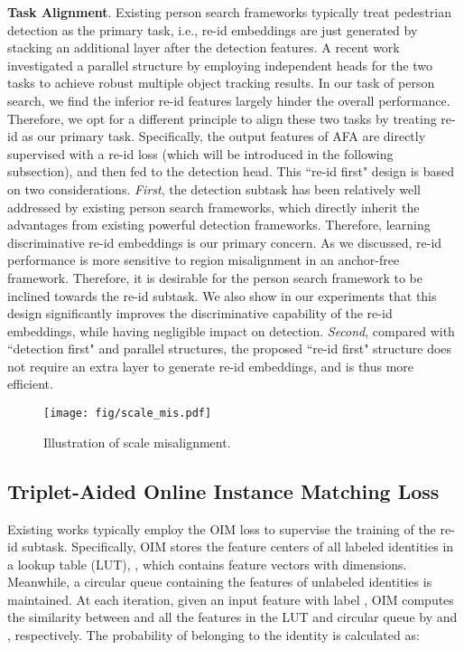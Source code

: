 \documentclass[journal]{IEEEtran}
\begin{document}
\textbf{Task Alignment}. Existing person search frameworks typically treat pedestrian detection as the primary task, i.e., re-id embeddings are just generated by stacking an additional layer after the detection features. A recent work~\cite{DBLP:journals/corr/abs-2004-01888} investigated a parallel structure by employing independent heads for the two tasks to achieve robust multiple object tracking results. In our task of person search, we find the inferior re-id features largely hinder the overall performance. Therefore, we opt for a different principle to align these two tasks by treating re-id as our primary task. Specifically, the output features of AFA are directly supervised with a re-id loss (which will be introduced in the following subsection), and then fed to the detection head. This ``re-id first" design is based on two considerations. \emph{First}, the detection subtask has been relatively well addressed by existing person search frameworks, which directly inherit the advantages from existing powerful detection frameworks. Therefore, learning discriminative re-id embeddings is our primary concern. As we discussed, re-id performance is more sensitive to region misalignment in an anchor-free framework. Therefore, 
it is desirable for the person search framework to be inclined towards the re-id subtask. We also show in our experiments that this design significantly improves the discriminative capability of the re-id embeddings, while having negligible impact on detection. \emph{Second}, compared with ``detection first" and parallel structures, the proposed ``re-id first" structure does not require an extra layer to generate re-id embeddings, and is thus more efficient.

\begin{figure}[t]
\centering
\texttt{[image: fig/scale\_mis.pdf]}
\caption{Illustration of scale misalignment.}\label{fig:sm}
\end{figure}



\subsection{Triplet-Aided Online Instance Matching Loss}
Existing works typically employ the OIM loss to supervise the training of the re-id subtask. Specifically, OIM stores the feature centers of all labeled identities in a lookup table (LUT), , which contains  feature vectors with  dimensions. Meanwhile, a circular queue  containing the features of  unlabeled identities is maintained. At each iteration, given an input feature  with label , OIM computes the similarity between  and all the features in the LUT and circular queue by  and , respectively. The probability of  belonging to the identity  is calculated as:
\end{document}
